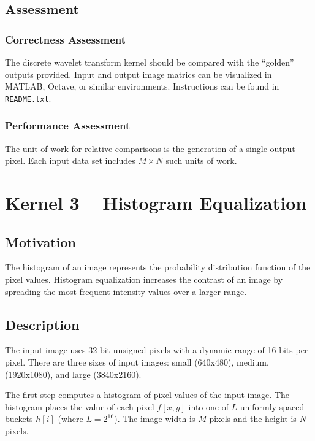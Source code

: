 \documentclass{report}
\begin{document}
\subsection{Assessment}

\subsubsection{Correctness Assessment}

The discrete wavelet transform kernel should be compared with the ``golden'' outputs provided.
Input and output image matrics can be visualized in MATLAB, Octave, or similar
environments.  Instructions can be found in \texttt{README.txt}.

\subsubsection{Performance Assessment}

The unit of work for relative comparisons is the generation of a single
output pixel.
Each input data set includes $M \times N$ such units of work.


\section{Kernel 3 -- Histogram Equalization}
\label{sec:app1:histeq}

\subsection{Motivation}

The histogram of an image represents the probability distribution function of
the pixel values.  Histogram equalization increases the contrast of an image by
spreading the most frequent intensity values over a larger range.

\subsection{Description}

The input image uses 32-bit unsigned pixels with a dynamic range of 16 bits per
pixel.
There are three sizes of input images: small (640x480), medium, (1920x1080),
and large (3840x2160).

The first step computes a histogram of pixel values of the input
image.  The histogram places the value of each pixel $f[x,y]$ into one of $L$
uniformly-spaced buckets $h[i]$ (where $L = 2^{16}$).
The image width is $M$ pixels and the height is $N$ pixels.
\end{document}
